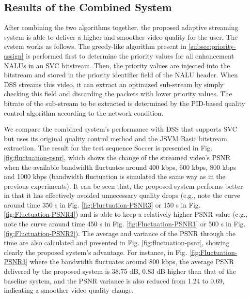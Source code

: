 \documentclass[journal]{IEEEtran}
\begin{document}
\subsection{Results of the Combined System}
\label{subsec:exp-combined}

After combining the two algorithms together, the proposed adaptive streaming system is able to deliver a higher and smoother video quality for the user. The system works as follows. The greedy-like algorithm present in \ref{subsec:priority-assign} is performed first to determine the priority values for all enhancement NALUs in an SVC bitstream. Then, the priority values are injected into the bitstream and stored in the priority identifier field of the NALU header. When DSS streams this video, it can extract an optimized sub-stream by simply checking this field and discarding the packets with lower priority values. The bitrate of the sub-stream to be extracted is determined by the PID-based quality control algorithm according to the network condition.

We compare the combined system's performance with DSS that supports SVC but uses its original quality control method and the JSVM Basic bitstream extraction. The result for the test sequence Soccer is presented in Fig. \ref{fig:fluctuation-psnr}, which shows the change of the streamed video's PSNR when the available bandwidth fluctuates around 400 kbps, 600 kbps, 800 kbps and 1000 kbps (bandwidth fluctuation is simulated the same way as in the previous experiments). It can be seen that, the proposed system performs better in that it has effectively avoided unnecessary quality drops (e.g., note the curve around time 350 s in Fig. \ref{fig:Fluctuation-PSNR3} or 150 s in Fig. \ref{fig:Fluctuation-PSNR4}) and is able to keep a relatively higher PSNR value (e.g., note the curve around time 450 s in Fig. \ref{fig:Fluctuation-PSNR1} or 500 s in Fig. \ref{fig:Fluctuation-PSNR2}). The average and variance of the PSNR through the time are also calculated and presented in Fig. \ref{fig:fluctuation-psnr}, showing clearly the proposed system's advantage. For instance, in Fig. \ref{fig:Fluctuation-PSNR3} where the bandwidth fluctuates around 800 kbps, the average PSNR delivered by the proposed system is 38.75 dB, 0.83 dB higher than that of the baseline system, and the PSNR variance is also reduced from 1.24 to 0.69, indicating a smoother video quality change.
\end{document}

